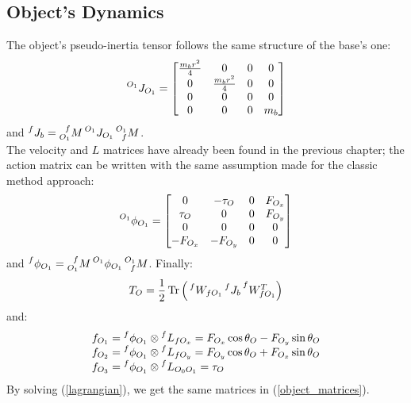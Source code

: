 \documentclass[a4paper,12pt,oneside]{report}
\DeclareMathOperator{\Tr}{Tr}
\begin{document}
\subsection{Object's Dynamics}
The object's pseudo-inertia tensor follows the same structure of the base's one:
\begin{equation}
  \prescript{O_1}{}{J_{O_1}}=\begin{bmatrix}
    \frac{m_br^2}{4}&0&0&0\\
    0&\frac{m_br^2}{4}&0&0\\
    0&0&0&0\\
    0&0&0&m_b
  \end{bmatrix}
\end{equation}
and $\prescript{f}{}{J_b}=\prescript{f}{O_1}{M}\prescript{O_1}{}{J_{O_1}}\prescript{O_1}{f}{M}$.\\
The velocity and $L$ matrices have already been found in the previous chapter; the action matrix can be written with the same assumption made for the classic method approach:
\begin{equation}
  \prescript{O_1}{}{\phi_{O_1}}=\begin{bmatrix}
    0&-\tau_O&0&F_{O_x}\\
    \tau_O&0&0&F_{O_y}\\
    0&0&0&0\\
    -F_{O_x}&-F_{O_y}&0&0
  \end{bmatrix}
\end{equation}
and $\prescript{f}{}{\phi_{O_1}}=\prescript{f}{O_1}{M}\prescript{O_1}{}{\phi_{O_1}}\prescript{O_1}{f}{M}$.
Finally:
\begin{equation}
  T_O=\frac{1}{2}\Tr{\Big(\prescript{f}{}{W_{fO_1}}\prescript{f}{}{J_b}\prescript{f}{}{W_{fO_1}^T}\Big)}
\end{equation}
and:
\begin{equation}
  \begin{array}{l}
    f_{O_1}=\prescript{f}{}{\phi_{O_1}}\otimes \prescript{f}{}{L_{fO_x}}=F_{O_x}\cos{\theta_O}-F_{O_y}\sin{\theta_O}\\
    f_{O_2}=\prescript{f}{}{\phi_{O_1}}\otimes \prescript{f}{}{L_{fO_y}}=F_{O_y}\cos{\theta_O}+F_{O_x}\sin{\theta_O}\\
    f_{O_3}=\prescript{f}{}{\phi_{O_1}}\otimes \prescript{f}{}{L_{O_0O_1}}=\tau_O
  \end{array}
\end{equation}
By solving (\ref{lagrangian}), we get the same matrices in (\ref{object_matrices}).
\newpage
\end{document}
